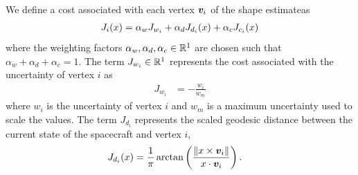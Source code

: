 We define a cost associated with each vertex \( \bm{v}_i \) of the shape estimateas
\begin{align}\label{eq:explore_cost}
    J_i (x) = \alpha_w J_{w_i} + \alpha_d J_{d_i}(x) + \alpha_c J_{c_i}(x)
\end{align}
where the weighting factors \( \alpha_w, \alpha_d, \alpha_c \in \mathbb{R}^1 \) are chosen such that \( \alpha_w + \alpha_d + \alpha_c = 1 \).
The term \( J_{w_i} \in \mathbb{R}^1 \) represents the cost associated with the uncertainty of vertex \( i \) as
\begin{align}\label{eq:weight_cost}
    J_{w_i} &= - \frac{w_i}{w_m}
\end{align}
where \( w_i \) is the uncertainty of vertex \( i \) and \( w_m \) is a maximum uncertainty used to scale the values.
The term \( J_{d_i} \) represents the scaled geodesic distance between the current state of the spacecraft and vertex \( i \),
\begin{align}\label{eq:distance_cost}
    J_{d_i}(x) &= \frac{1}{\pi} \arctan \left(  \frac{\left\| x \times \bm{v}_i \right\|}{x \cdot \bm{v}_i} \right).
\end{align}

